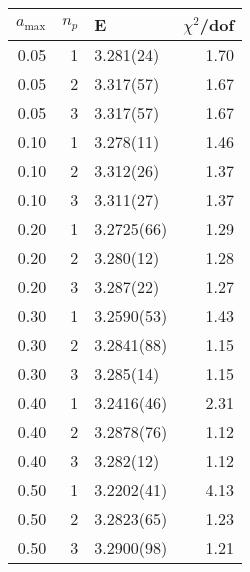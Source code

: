 \begin{tabular}{rrlr}
\hline
   $a_\textrm{max}$ &   $n_p$ & E          &   $\chi^2$/dof \\
\hline
               0.05 &       1 & 3.281(24)  &           1.70 \\
               0.05 &       2 & 3.317(57)  &           1.67 \\
               0.05 &       3 & 3.317(57)  &           1.67 \\
               0.10 &       1 & 3.278(11)  &           1.46 \\
               0.10 &       2 & 3.312(26)  &           1.37 \\
               0.10 &       3 & 3.311(27)  &           1.37 \\
               0.20 &       1 & 3.2725(66) &           1.29 \\
               0.20 &       2 & 3.280(12)  &           1.28 \\
               0.20 &       3 & 3.287(22)  &           1.27 \\
               0.30 &       1 & 3.2590(53) &           1.43 \\
               0.30 &       2 & 3.2841(88) &           1.15 \\
               0.30 &       3 & 3.285(14)  &           1.15 \\
               0.40 &       1 & 3.2416(46) &           2.31 \\
               0.40 &       2 & 3.2878(76) &           1.12 \\
               0.40 &       3 & 3.282(12)  &           1.12 \\
               0.50 &       1 & 3.2202(41) &           4.13 \\
               0.50 &       2 & 3.2823(65) &           1.23 \\
               0.50 &       3 & 3.2900(98) &           1.21 \\
\hline
\end{tabular}

